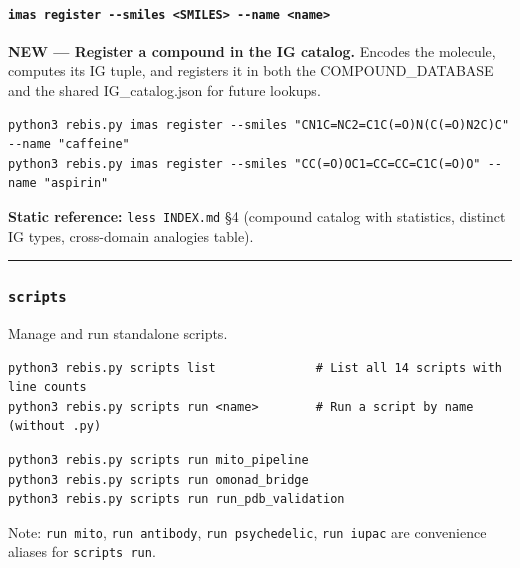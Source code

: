 \hypertarget{imas-register---smiles-smiles---name-name}{%
\paragraph{\texorpdfstring{\texttt{imas\ register\ -\/-smiles\ \textless{}SMILES\textgreater{}\ -\/-name\ \textless{}name\textgreater{}}}{imas register -\/-smiles \textless SMILES\textgreater{} -\/-name \textless name\textgreater{}}}\label{imas-register---smiles-smiles---name-name}}

\textbf{NEW --- Register a compound in the IG catalog.} Encodes the
molecule, computes its IG tuple, and registers it in both the
COMPOUND\_DATABASE and the shared IG\_catalog.json for future lookups.

\begin{verbatim}
python3 rebis.py imas register --smiles "CN1C=NC2=C1C(=O)N(C(=O)N2C)C" --name "caffeine"
python3 rebis.py imas register --smiles "CC(=O)OC1=CC=CC=C1C(=O)O" --name "aspirin"
\end{verbatim}

\textbf{Static reference:} \texttt{less\ INDEX.md} §4 (compound catalog
with statistics, distinct IG types, cross-domain analogies table).

\begin{center}\rule{0.5\linewidth}{0.5pt}\end{center}

\hypertarget{scripts}{%
\subsubsection{\texorpdfstring{\texttt{scripts}}{scripts}}\label{scripts}}

Manage and run standalone scripts.

\begin{verbatim}
python3 rebis.py scripts list              # List all 14 scripts with line counts
python3 rebis.py scripts run <name>        # Run a script by name (without .py)
\end{verbatim}

\begin{verbatim}
python3 rebis.py scripts run mito_pipeline
python3 rebis.py scripts run omonad_bridge
python3 rebis.py scripts run run_pdb_validation
\end{verbatim}

Note: \texttt{run\ mito}, \texttt{run\ antibody},
\texttt{run\ psychedelic}, \texttt{run\ iupac} are convenience aliases
for \texttt{scripts\ run}.


